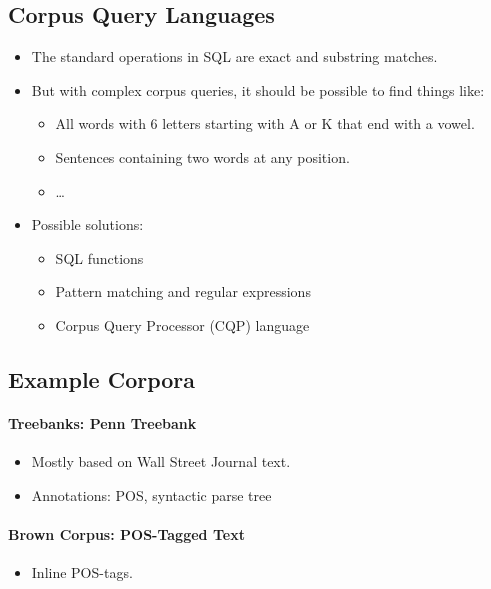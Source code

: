 \documentclass[a4paper, 11pt, accentcolor = tud3b]{tudreport}
\begin{document}
            \subsection{Corpus Query Languages} %
                \begin{itemize}
                	\item The standard operations in SQL are exact and substring matches.
                	\item But with complex corpus queries, it should be possible to find things like:
                		\begin{itemize}
                			\item All words with 6 letters starting with A or K that end with a vowel.
                			\item Sentences containing two words at any position.
                			\item \dots
                		\end{itemize}
                	\item Possible solutions:
                		\begin{itemize}
                			\item SQL functions
                			\item Pattern matching and regular expressions
                			\item Corpus Query Processor (CQP) language
                		\end{itemize}
                \end{itemize}

            \subsection{Example Corpora} %
                \paragraph{Treebanks: Penn Treebank} %
                	\begin{itemize}
                		\item Mostly based on Wall Street Journal text.
                		\item Annotations: POS, syntactic parse tree
                	\end{itemize}
                
                \paragraph{Brown Corpus: POS-Tagged Text} %
                	\begin{itemize}
                		\item Inline POS-tags.
                	\end{itemize}
\end{document}
